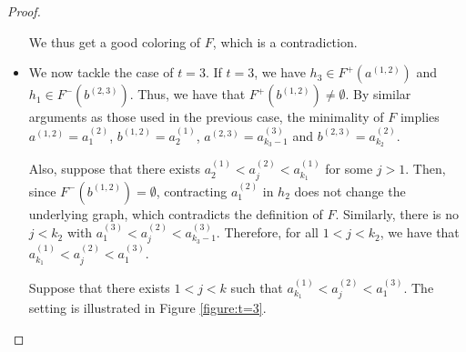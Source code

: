 \documentclass[12pt]{article}
\theoremstyle{definition}
\begin{document}
\begin{proof}
\begin{itemize}
             We thus get a good coloring
             of $F$, which is a contradiction.

             \item We now tackle the case of $t = 3$.
             If $t = 3$, we have $h_3 \in F^{+}
             \left(a^{\left(1, 2\right)}\right)$ 
             and $h_1 \in F^{-}\left(b^{\left(2, 3\right)}\right)$.
             Thus, we have that $F^{+}\left(b^{\left(1, 2\right)}\right)
             \neq \emptyset$.
             By similar arguments as those
             used in the previous case,
             the minimality of $F$ implies
             $a^{\left(1, 2\right)} = a_1^{\left(2\right)}$,
             $b^{\left(1, 2\right)} = a_2^{\left(1\right)}$,
             $a^{\left(2, 3\right)} = a_{k_3 - 1}^{\left(3\right)}$ and
             $b^{\left(2, 3\right)} = a_{k_2}^{\left(2\right)}$.

             Also, suppose that there exists
             $a_2^{\left(1\right)} < a_{j}^{\left(2\right)} <
             a_{k_1}^{\left(1\right)}$ for
             some $j > 1$. Then,
             since $F^{-}\left(b^{\left(1, 2\right)}\right) = \emptyset$, 
             contracting $a_1^{\left(2\right)}$ 
             in $h_2$ does not change the
             underlying graph, which
             contradicts the definition of $F$.
             Similarly, there is no
             $j < k_2$ with $a_1^{\left(3\right)} <
             a_{j}^{\left(2\right)} <
             a_{k_3-1}^{\left(3\right)}$.
             Therefore, for all
             $1 < j < k_2$, we have
             that $a_{k_1}^{\left(1\right)} < 
             a_{j}^{\left(2\right)} < 
             a_1^{\left(3\right)}$.

             Suppose that there exists
             $1 < j < k$ such that
             $a_{k_1}^{\left(1\right)} <
             a_{j}^{\left(2\right)} <
             a_1^{\left(3\right)}$.
             The setting is illustrated
             in Figure \ref{figure:t=3}.
             
             \begin{figure}[ht]
             \begin{center}
\end{center}
\end{figure}
\end{itemize}
\end{proof}
\end{document}
